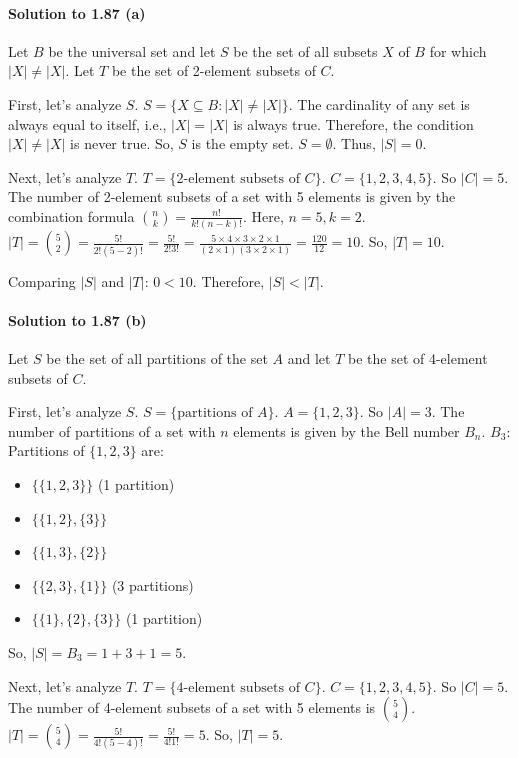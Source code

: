 \documentclass{article}
\begin{document}
\begin{itemize}
\begin{itemize}
\paragraph*{Solution to 1.87 (a)}
Let $B$ be the universal set and let $S$ be the set of all subsets $X$ of $B$ for which $|X| \neq |X|$. Let $T$ be the set of 2-element subsets of $C$.

First, let's analyze $S$. $S = \{X \subseteq B : |X| \neq |X|\}$.
The cardinality of any set is always equal to itself, i.e., $|X| = |X|$ is always true.
Therefore, the condition $|X| \neq |X|$ is never true.
So, $S$ is the empty set. $S = \emptyset$.
Thus, $|S| = 0$.

Next, let's analyze $T$. $T = \{\text{2-element subsets of } C\}$.
$C = \{1, 2, 3, 4, 5\}$. So $|C| = 5$.
The number of 2-element subsets of a set with 5 elements is given by the combination formula $\binom{n}{k} = \frac{n!}{k!(n-k)!}$.
Here, $n=5, k=2$.
$|T| = \binom{5}{2} = \frac{5!}{2!(5-2)!} = \frac{5!}{2!3!} = \frac{5 \times 4 \times 3 \times 2 \times 1}{(2 \times 1)(3 \times 2 \times 1)} = \frac{120}{12} = 10$.
So, $|T| = 10$.

Comparing $|S|$ and $|T|$: $0 < 10$.
Therefore, $|S| < |T|$.

\paragraph*{Solution to 1.87 (b)}
Let $S$ be the set of all partitions of the set $A$ and let $T$ be the set of 4-element subsets of $C$.

First, let's analyze $S$. $S = \{\text{partitions of } A\}$.
$A = \{1, 2, 3\}$. So $|A| = 3$.
The number of partitions of a set with $n$ elements is given by the Bell number $B_n$.
$B_3$:
Partitions of $\{1, 2, 3\}$ are:
\begin{itemize}
    \item $\{\{1, 2, 3\}\}$ (1 partition)
    \item $\{\{1, 2\}, \{3\}\}$
    \item $\{\{1, 3\}, \{2\}\}$
    \item $\{\{2, 3\}, \{1\}\}$ (3 partitions)
    \item $\{\{1\}, \{2\}, \{3\}\}$ (1 partition)
\end{itemize}
So, $|S| = B_3 = 1 + 3 + 1 = 5$.

Next, let's analyze $T$. $T = \{\text{4-element subsets of } C\}$.
$C = \{1, 2, 3, 4, 5\}$. So $|C| = 5$.
The number of 4-element subsets of a set with 5 elements is $\binom{5}{4}$.
$|T| = \binom{5}{4} = \frac{5!}{4!(5-4)!} = \frac{5!}{4!1!} = 5$.
So, $|T| = 5$.


\end{itemize}
\end{itemize}
\end{document}
